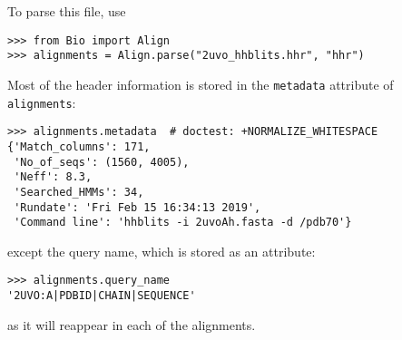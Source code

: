 To parse this file, use
\begin{verbatim}
>>> from Bio import Align
>>> alignments = Align.parse("2uvo_hhblits.hhr", "hhr")
\end{verbatim}
Most of the header information is stored in the \verb|metadata| attribute of \verb|alignments|:
\begin{verbatim}
>>> alignments.metadata  # doctest: +NORMALIZE_WHITESPACE
{'Match_columns': 171,
 'No_of_seqs': (1560, 4005),
 'Neff': 8.3,
 'Searched_HMMs': 34,
 'Rundate': 'Fri Feb 15 16:34:13 2019',
 'Command line': 'hhblits -i 2uvoAh.fasta -d /pdb70'}
\end{verbatim}
except the query name, which is stored as an attribute:
\begin{verbatim}
>>> alignments.query_name
'2UVO:A|PDBID|CHAIN|SEQUENCE'
\end{verbatim}
as it will reappear in each of the alignments.

